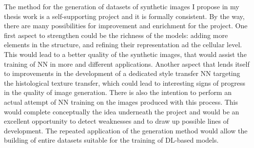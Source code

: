The method for the generation of datasets of synthetic images I propose in my thesis work is a self-supporting project and it is formally consistent. By the way, there are many possibilities for improvement and enrichment for the project. One first aspect to strengthen could be the richness of the models: adding more elements in the structure, and refining their representation ad the cellular level. This would lead to a better quality of the synthetic images, that would assist the training of NN in more and different applications. Another aspect that lends itself to improvements in the development of a dedicated style transfer NN targeting the histological texture transfer, which could lead to interesting signs of progress in the quality of image generation. There is also the intention to perform an actual attempt of NN training on the images produced with this process. This would complete conceptually the idea underneath the project and would be an excellent opportunity to detect weaknesses and to draw up possible lines of development. The repeated application of the generation method would allow the building of entire datasets suitable for the training of DL-based models.
